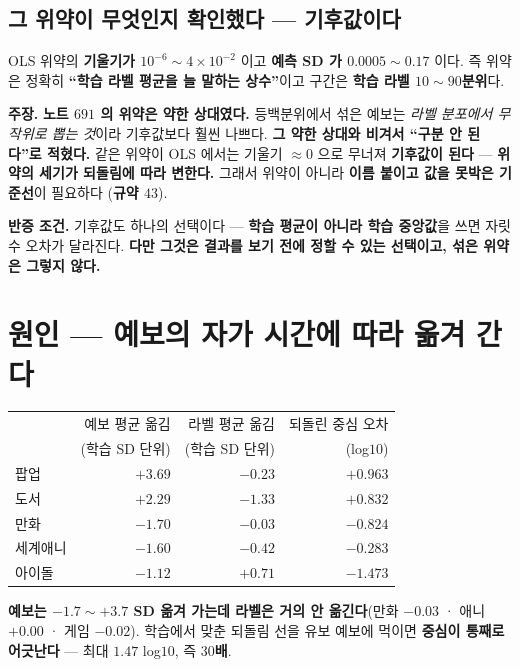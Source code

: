 \documentclass[10pt,a4paper]{article}
\newcommand{\claim}[2]{\begin{claimbox}\textbf{주장.} #1\par\smallskip
  \textcolor{gray!70}{\textbf{반증 조건.} #2}\end{claimbox}}
\begin{document}
\subsection*{그 위약이 무엇인지 확인했다 --- 기후값이다}

OLS 위약의 \textbf{기울기가 $10^{-6} \sim 4{\times}10^{-2}$} 이고 \textbf{예측 SD
가 $0.0005 \sim 0.17$} 이다. 즉 위약은 정확히 \textbf{``학습 라벨 평균을 늘 말하는
상수''}이고 구간은 \textbf{학습 라벨 $10{\sim}90$분위}다.

\claim{\textbf{노트 $691$ 의 위약은 약한 상대였다.} 등백분위에서 섞은 예보는
\emph{라벨 분포에서 무작위로 뽑는 것}이라 기후값보다 훨씬 나쁘다. \textbf{그 약한
상대와 비겨서 ``구분 안 된다''로 적혔다.} 같은 위약이 OLS 에서는 기울기 $\approx 0$
으로 무너져 \textbf{기후값이 된다} --- \textbf{위약의 세기가 되돌림에 따라 변한다.}
그래서 위약이 아니라 \textbf{이름 붙이고 값을 못박은 기준선}이 필요하다
(\textbf{규약 $43$}).}
{기후값도 하나의 선택이다 --- \textbf{학습 평균이 아니라 학습 중앙값}을 쓰면
자릿수 오차가 달라진다. \textbf{다만 그것은 결과를 보기 전에 정할 수 있는
선택이고, 섞은 위약은 그렇지 않다.}}

\section{원인 --- 예보의 자가 시간에 따라 옮겨 간다}

\begin{center}
\begin{tabular}{lrrr}
\toprule
& 예보 평균 옮김 & 라벨 평균 옮김 & 되돌린 중심 오차 \\
& (학습 SD 단위) & (학습 SD 단위) & (log$10$) \\
\midrule
팝업 & $\mathbf{+3.69}$ & $-0.23$ & $+0.963$ \\
도서 & $+2.29$ & $-1.33$ & $+0.832$ \\
만화 & $\mathbf{-1.70}$ & $-0.03$ & $-0.824$ \\
세계애니 & $-1.60$ & $-0.42$ & $-0.283$ \\
아이돌 & $-1.12$ & $+0.71$ & $\mathbf{-1.473}$ \\
\bottomrule
\end{tabular}
\end{center}

\textbf{예보는 $-1.7 \sim +3.7$ SD 옮겨 가는데 라벨은 거의 안 옮긴다}(만화 $-0.03$ ·
애니 $+0.00$ · 게임 $-0.02$). 학습에서 맞춘 되돌림 선을 유보 예보에 먹이면
\textbf{중심이 통째로 어긋난다} --- 최대 $1.47$ log$10$, 즉 \textbf{$30$배}.
\end{document}
